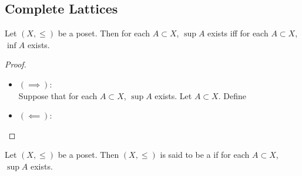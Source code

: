 \documentclass{book}
\begin{document}
	
	
	
	
	
	
	
	
	
	
	
	
	
	
	
	
	
	
	
	
	
	
	
	
	
	
	
	
	
	
	
	
	
	
	
	
	
	
	
	
	
	
	
	\subsection{Complete Lattices}
	
	\begin{ex}
		Let $(X, \leq)$ be a poset. Then for each $A \subset X$, $\sup A$ exists iff for each $A \subset X$, $\inf A$ exists. 
	\end{ex}
	
	\begin{proof}\
		\begin{itemize}
			\item $(\implies)$: \\
			Suppose that for each $A \subset X$, $\sup A$ exists. Let $A \subset X$. Define 
			\item $(\impliedby)$: \\
		\end{itemize}
	\end{proof}
	
	\begin{defn}
		Let $(X, \leq)$ be a poset. Then $(X, \leq)$ is said to be a  if for each $A \subset X$, $\sup A$ exists. 
	\end{defn}
	
	
	
	
	
	
	
	
	
	
	
	
	
	
	
	
	
\end{document}

